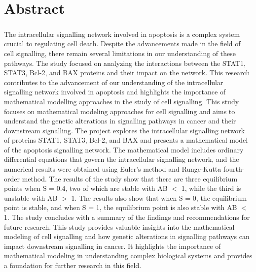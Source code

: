\chapter*{Abstract}
\paragraph{}

The intracellular signalling network involved in apoptosis is a complex system crucial to regulating cell death. Despite the advancements made in the field of cell signalling, there remain several limitations in our understanding of these pathways. The study focused on analyzing the interactions between the STAT1, STAT3, Bcl-2, and BAX proteins and their impact on the network. This research contributes to the advancement of our understanding of the intracellular signalling network involved in apoptosis and highlights the importance of mathematical modelling approaches in the study of cell signalling. This study focuses on mathematical modeling approaches for cell signalling and aims to understand the genetic alterations in signalling pathways in cancer and their downstream signalling. The project explores the intracellular signalling network of proteins STAT1, STAT3, Bcl-2, and BAX and presents a mathematical model of the apoptosis signalling network. The mathematical model includes ordinary differential equations that govern the intracellular signalling network, and the numerical results were obtained using Euler's method and Runge-Kutta fourth-order method. The results of the study show that there are three equilibrium points when S = 0.4, two of which are stable with AB $<$ 1, while the third is unstable with AB $>$ 1. The results also show that when S = 0, the equilibrium point is stable, and when S = 1, the equilibrium point is also stable with AB $<$ 1. The study concludes with a summary of the findings and recommendations for future research. This study provides valuable insights into the mathematical modeling of cell signalling and how genetic alterations in signalling pathways can impact downstream signalling in cancer. It highlights the importance of mathematical modeling in understanding complex biological systems and provides a foundation for further research in this field.
